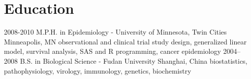 \section{Education}

\begin{entrylist}
  \entry
    {2008-2010}
    {M.P.H. in Epidemiology - University of Minnesota, Twin Cities}
    {Minneapolis, MN}
    {observational and clinical trial study design, generalized linear model, survival analysis, SAS and R programming, cancer epidemiology}
  \entry
    {2004–2008}
    {B.S. in Biological Science - Fudan University}
    {Shanghai, China}
    {biostatistics, pathophysiology, virology, immunology, genetics, biochemistry}
\end{entrylist}

